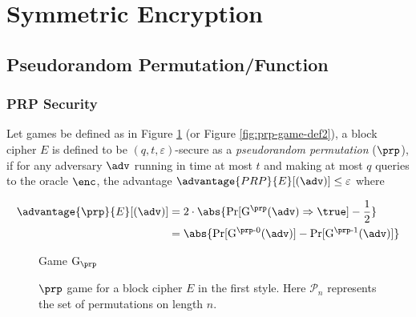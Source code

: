 \newpage
\section{Symmetric Encryption}

\subsection{Pseudorandom Permutation/Function}
\subsubsection{PRP Security}
Let games be defined as in Figure \ref{fig:prp-game-def1} (or Figure \ref{fig:prp-game-def2}), a block cipher $E$ is defined to be $(q,t,\varepsilon)$-secure as a \textit{pseudorandom permutation} ($\prp$), if for any adversary $\adv$ running in time at most $t$ and making at most $q$ queries to the oracle $\enc$, the advantage $\advantage{PRP}{E}[(\adv)] \leq \varepsilon$ where  

$$
\begin{aligned}
\advantage{\prp}{E}[(\adv)] &= 2 \cdot \abs{\Pr[\mathrm{G}^\prp(\adv) \Rightarrow \true ] - \frac{1}{2}} \\
&= \abs{\Pr[\mathrm{G}^{\prp\textrm-0}(\adv)] - \Pr[\mathrm{G}^{\prp\textrm-1}(\adv)]}
\end{aligned}
$$ 


\begin{figure}[h]
\centering
\begin{codeframe}[colback = white, width=8.75cm, boxsep=5pt]{Game $\mathrm{G}_\prp$}
\begin{pchstack}[space=0.5cm]
\begin{pcvstack}[space=0.3cm]

\end{pcvstack}

\end{pchstack}
\end{codeframe}
\caption{$\prp$ game for a block cipher $E$ in the first style. Here $\mathcal{P}_n$ represents the set of permutations on length $n$. }
\label{fig:prp-game-def1}
\end{figure}



